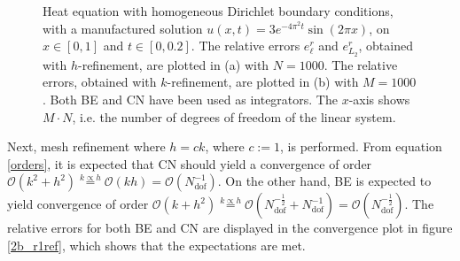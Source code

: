 \begin{figure}
\centering
{}\hspace{0mm}
\hspace{0mm}
\caption{ Heat equation with homogeneous Dirichlet boundary conditions, with a manufactured solution $u(x,t) = 3 e^{-4 \pi^2 t} \sin{(2 \pi x)}$, on $x \in [0, 1]$ and $t \in [0, 0.2]$. The relative errors $e_\ell^r$ and $e_{L_2}^r$, obtained with $h$-refinement, are plotted in (a) with $N = 1000$. The relative errors, obtained with $k$-refinement, are plotted in (b) with $M = 1000$. Both BE and CN have been used as integrators. The $x$-axis shows $M \cdot N$, i.e. the number of degrees of freedom of the linear system.}
\end{figure}

Next, mesh refinement where $h = ck$, where $c := 1$, is performed.  From equation \eqref{orders}, it is expected that CN should yield a convergence of order $\mathcal{O}(k^2 + h^2) \overset{k \propto h} = \mathcal{O}(kh) = \mathcal{O}(N_{\mathrm{dof}}^{-1})$. On the other hand, BE is expected to yield convergence of order $\mathcal{O}(k + h^2) \overset{k \propto h} = \mathcal{O}(N_{\mathrm{dof}}^{-\frac{1}{2}} + N_{\mathrm{dof}}^{-1}) = \mathcal{O}(N_{\mathrm{dof}}^{-\frac{1}{2}} )$. The relative errors for both BE and CN are displayed in the convergence plot in figure \ref{2b_r1ref}, which shows that the expectations are met.

